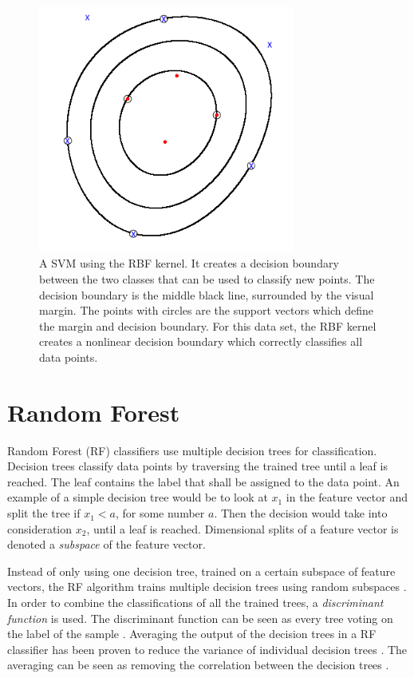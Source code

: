 \begin{figure}
  \centering
    \includegraphics[width=0.75\textwidth]{figures/SVM_RBF_Circular}
  \caption{A SVM using the RBF kernel.
  It creates a decision boundary between the two classes that can be used to classify new points.
  The decision boundary is the middle black line, surrounded by the visual margin.
  The points with circles are the support vectors which define the margin and decision boundary.
  For this data set, the RBF kernel creates a nonlinear decision boundary which correctly classifies all data points.}
  \label{fig:svm-rbf}
\end{figure}

\newpage
\section{Random Forest}
Random Forest (RF) classifiers use multiple decision trees for classification.
Decision trees classify data points by traversing the trained tree until a leaf is reached.
The leaf contains the label that shall be assigned to the data point.
An example of a simple decision tree would be to look at $x_1$ in the feature vector and split the tree if $x_1 < a$, for some number $a$.
Then the decision would take into consideration $x_2$, until a leaf is reached.
Dimensional splits of a feature vector is denoted a \textit{subspace} of the feature vector.

Instead of only using one decision tree, trained on a certain subspace of feature vectors, the RF algorithm trains multiple decision trees \cite{Breiman2001, Ho1995} using random subspaces \cite{Ho1998}.
In order to combine the classifications of all the trained trees, a \textit{discriminant function} is used.
The discriminant function can be seen as every tree voting on the label of the sample \cite{Breiman2001}.
Averaging the output of the decision trees in a RF classifier has been proven to reduce the variance of individual decision trees \cite{Breiman2001}.
The averaging can be seen as removing the correlation between the decision trees \cite{Ho1998}.

